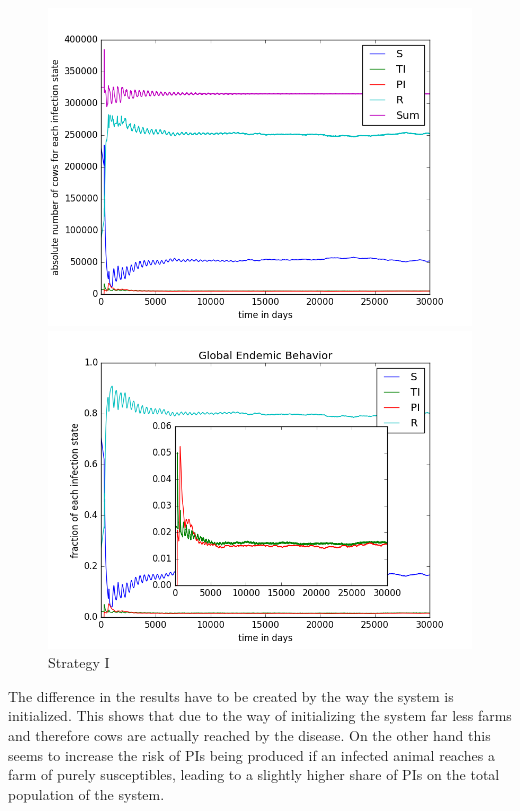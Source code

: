 \begin{figure}[htbp]
\begin{minipage}{0.5\textwidth}
\centering
\noindent\includegraphics[width=0.95\linewidth,height=\textheight,
keepaspectratio]{cont1totalEndemicNumbers.png} 
\end{minipage}
\begin{minipage}{0.5\textwidth}
\centering
\noindent\includegraphics[width=0.95\linewidth,height=\textheight,
keepaspectratio]{cont1endemicFractions.png} 
\end{minipage}
\caption[Endemic Behavior in Containment Strategy One]{Strategy I}
\label{fig:cont1Behav}
\end{figure} 

The difference in the results have to be created by the way the system is initialized. This shows that due to the way of initializing the system far less farms and therefore cows are actually reached by the disease. On the other hand this seems to increase the risk of PIs being produced if an infected animal reaches a farm of purely susceptibles, leading to a slightly higher share of PIs on the total population of the system.

